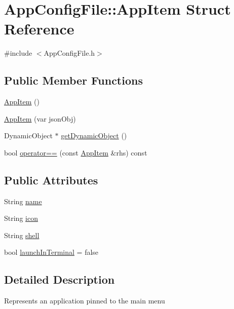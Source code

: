 \hypertarget{structAppConfigFile_1_1AppItem}{}\section{App\+Config\+File\+:\+:App\+Item Struct Reference}
\label{structAppConfigFile_1_1AppItem}


{\ttfamily \#include $<$App\+Config\+File.\+h$>$}

\subsection*{Public Member Functions}
\begin{DoxyCompactItemize}
\item 
\mbox{\hyperlink{structAppConfigFile_1_1AppItem_a89719db20b034986d64a0dd294dac1a8}{App\+Item}} ()
\item 
\mbox{\hyperlink{structAppConfigFile_1_1AppItem_a13b53e6a54c637e25c398d9d0d671a44}{App\+Item}} (var json\+Obj)
\item 
Dynamic\+Object $\ast$ \mbox{\hyperlink{structAppConfigFile_1_1AppItem_aeb7a307ccf35208d4ac6e99896cf36a4}{get\+Dynamic\+Object}} ()
\item 
bool \mbox{\hyperlink{structAppConfigFile_1_1AppItem_a59f1da2494ec22640457936c74e2761e}{operator==}} (const \mbox{\hyperlink{structAppConfigFile_1_1AppItem}{App\+Item}} \&rhs) const
\end{DoxyCompactItemize}
\subsection*{Public Attributes}
\begin{DoxyCompactItemize}
\item 
String \mbox{\hyperlink{structAppConfigFile_1_1AppItem_aeaf1017ffc17a97da64da86187468597}{name}}
\item 
String \mbox{\hyperlink{structAppConfigFile_1_1AppItem_a66b909148010e5c478eadc968c426947}{icon}}
\item 
String \mbox{\hyperlink{structAppConfigFile_1_1AppItem_aff5793aa12da18b14753f9647e627f39}{shell}}
\item 
bool \mbox{\hyperlink{structAppConfigFile_1_1AppItem_a378ce5972f077ca6c5a2a3c6986ce16f}{launch\+In\+Terminal}} = false
\end{DoxyCompactItemize}


\subsection{Detailed Description}
Represents an application pinned to the main menu 

